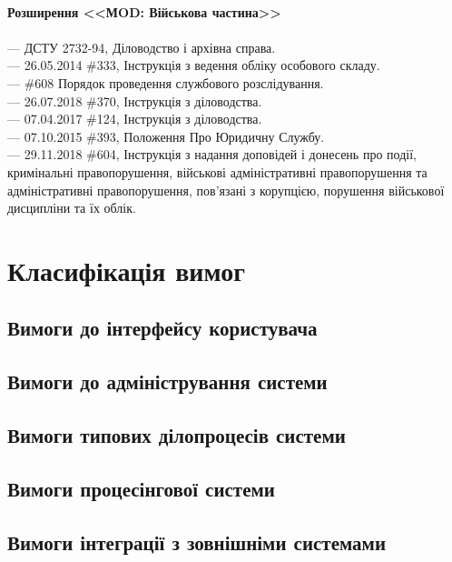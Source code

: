 \\
\newpage
{\bf Розширення <<МOD: Військова частина>>}
\\
\\
--- {ДСТУ 2732-94}, Діловодство і архівна справа. \\
--- {26.05.2014 \#333}, Інструкція з ведення обліку особового складу. \\
--- {\#608} Порядок проведення службового розслідування. \\
--- {26.07.2018 \#370}, Інструкція з діловодства. \\
--- {07.04.2017 \#124}, Інструкція з діловодства. \\
--- {07.10.2015 \#393}, Положення Про Юридичну Службу. \\
--- {29.11.2018 \#604}, Інструкція з надання доповідей і донесень про події,
                кримінальні правопорушення, військові адміністративні
                правопорушення та адміністративні правопорушення,
                пов'язані з корупцією, порушення військової дисципліни та їх облік. \\

\newpage
\section{Класифікація вимог}

\subsection{Вимоги до інтерфейсу користувача}

\subsection{Вимоги до адміністрування системи}

\subsection{Вимоги типових ділопроцесів системи}

\subsection{Вимоги процесінгової системи}

\subsection{Вимоги інтеграції з зовнішніми системами}

